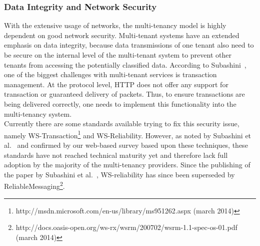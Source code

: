 \subsubsection{Data Integrity and Network Security}
With the extensive usage of networks, the multi-tenancy model is highly dependent on good network security.  
Multi-tenant systems have an extended emphasis on data integrity, because data transmissions of one tenant also need to be secure on the internal level of the multi-tenant system to prevent other tenants from accessing the potentially classified data.
According to Subashini~\cite{Subashini2011Security}, one of the biggest challenges with multi-tenant services is transaction management. 
At the protocol level, HTTP does not offer any support for transaction or guaranteed delivery of packets. 
Thus, to ensure transactions are being delivered correctly, one needs to implement this functionality into the multi-tenancy system.\\

Currently there are some standards available trying to fix this security issue, namely WS-Transaction\footnote{http://msdn.microsoft.com/en-us/library/ms951262.aspx (march 2014)} and WS-Reliability.
However, as noted by Subashini et al.~\cite{Subashini2011Security} and confirmed by our web-based survey based upon these techniques, these standards have not reached technical maturity yet and therefore lack full adoption by the majority of the multi-tenancy providers.
Since the publishing of the paper by Subashini et al.~\cite{Subashini2011Security}, WS-reliability has since been superseded by ReliableMessaging\footnote{http://docs.oasis-open.org/ws-rx/wsrm/200702/wsrm-1.1-spec-os-01.pdf (march 2014)}.

